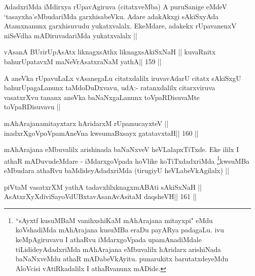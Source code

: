 \begin{artha}
AdadxriMda iMdirxya rUpavAgiruva (citatxveMba) A puruSanige eMdeV
`tasayxha'eMbudariMda garxhisabeVku. Adare adakAkxgi sAkiSxyAda
Atamxnanunx garxhisuvudu yukatxvalalx. EkeMdare, adakekx rUpavanenxV
niSeVdha mADiruvadariMda yukatxvalalx ||
\end{artha}


\begin{shl}
vAsanA BUrirUpAsAtx liknagxsAthx liknagxsAkiSxNaH ||
kuvaRnitx bahurUpatavxM maNeVrAsatxraNaM yathA\hfill || 159 ||
\end{shl}

\begin{artha}
A aneVka rUpavuLaLx vAsanegaLu citatxdalilx iruvavAdarU citatx
sAkiSxgU bahurUpagaLanunx taMdoDuDxvavu, udA:- ratanxdalilx
citarxviruva vasatxrXvu tananx aneVka baNaNxgaLanunx toVpaRDisuvaMte
toVpaRDisuvavu ||
\end{artha}

\begin{shl}
mAhArajanamitayxtarx hAridarxM rUpamucayxteV ||
\footnotemark[1]inadxrXgoVpoVpamAneVna kwsumaBxsayx gatatavxtaH\hfill || 160 ||
\end{shl}

\begin{artha}
mAhArajana eMbuvalilx arishinada baNaNxveV heVLalapxTiTxde. Eke ililx
I athaR mADuvudeMdare - iMdarxgoVpada hoVlike
koTiTxdadxriMda \footnote[1]{``sAyxtf kusuMBaM vanihxshiKaM mAhArajana
mitayxpi" eMdu koVshadiMda mAhArajana kusuMBa eraDu payARya
padagaLu. ivu keMpAgiruvavu I athaRvu iMdarxgoVpada upamAnadiMdale
tiLidideyAdadxriMda mAhArajana eMbuvalilx hAridarx arishiNada
baNaNxveMdu athaR mADabeVkAyitu. punarukitx barutatxdeyeMdu AloVcisi
vAtiRkadalilx I athaRvanunx mADide.}kwsuMBa eMbudara athaRvu
baMdideyAdadxriMda (tirugiyU heVLabeVkAgilalx) ||
\end{artha}

\begin{shl}
piVtaM vasatxrXM yathA tadavxlilxknagxmABAti sAkiSxNaH ||
AsAtxrXyXdiviSayoVdUBxtavAsanAvAsitaM daqsheVH\hfill || 161 ||
\end{shl}

